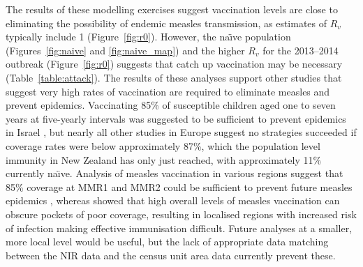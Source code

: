\documentclass{article}
\begin{document}
The results of these modelling exercises suggest vaccination levels are close to eliminating the possibility of endemic measles transmission, as estimates of $R_v$ typically include 1 (Figure~\autoref{fig:r0}). However, the na\"{\i}ve population (Figures~\autoref{fig:naive} and \autoref{fig:naive_map}) and the higher $R_v$ for the 2013--2014 outbreak (Figure~\autoref{fig:r0}) suggests that catch up vaccination may be necessary (Table~\autoref{table:attack}). The results of these analyses support other studies that suggest very high rates of vaccination are required to eliminate measles and prevent epidemics. Vaccinating 85\% of susceptible children aged one to seven years at five-yearly intervals was suggested to be sufficient to prevent epidemics in Israel \citep{agur93}, but nearly all other studies in Europe suggest no strategies succeeded if coverage rates were below approximately 87\%, which the population level immunity in New Zealand has only just reached, with approximately 11\% currently na\"{\i}ve. Analysis of measles vaccination in various regions suggest that 85\% coverage at MMR1 and MMR2 could be sufficient to prevent future measles epidemics \citep{agur93, babad95, edmunds0, gay98, wallinga1}, whereas \citep{glass4} showed that high overall levels of measles vaccination can obscure pockets of poor coverage, resulting in localised regions with increased risk of infection making effective immunisation difficult. Future analyses at a smaller, more local level would be useful, but the lack of appropriate data matching between the NIR data and the census unit area data currently prevent these.
\end{document}
